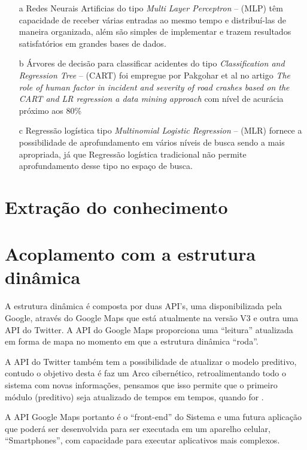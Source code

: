 \begin{itemize}
 \item[a] Redes Neurais Artificias do tipo \textit{ Multi Layer Perceptron}  -- (MLP) têm capacidade de receber várias entradas ao mesmo tempo e distribuí-las de maneira organizada, além 
	  são simples de implementar e trazem resultados satisfatórios em grandes bases de dados.
 
 \item[b] Árvores de decisão para classificar acidentes do tipo \textit{ Classification and Regression Tree}  -- (CART) foi empregue por Pakgohar et al no artigo 
	  \textit{The role of human factor in incident and severity of road crashes based on the CART and LR regression a data mining approach}  com nível de acurácia próximo aos 80\%

 \item[c] Regressão logística tipo \textit{Multinomial Logistic Regression} -- (MLR) fornece a possibilidade de aprofundamento em vários níveis de busca sendo a mais apropriada, já que Regressão logística 
	  tradicional não permite aprofundamento desse tipo no espaço de busca.
\end{itemize}



\section{ Extração do conhecimento}

\pagebreak

\section{ Acoplamento com a estrutura dinâmica}

A estrutura dinâmica é composta por duas API's, uma disponibilizada pela Google, através do Google Maps que está atualmente na versão V3 e 
outra uma API do Twitter. A API do Google Maps proporciona uma ``leitura'' atualizada em forma de mapa no momento em que a estrutura dinâmica ``roda''. 

A API do Twitter também tem a possibilidade de atualizar o modelo preditivo, contudo o objetivo desta é faz um Arco cibernético, 
retroalimentando todo o sistema com novas informações, pensamos que isso permite que o primeiro módulo (preditivo) seja atualizado de 
tempos em tempos, quando for .

A API Google Maps portanto é o ``front-end'' do Sistema e uma futura aplicação que poderá ser desenvolvida para ser executada em um aparelho 
celular, ``Smartphones'', com capacidade para executar aplicativos mais complexos.


